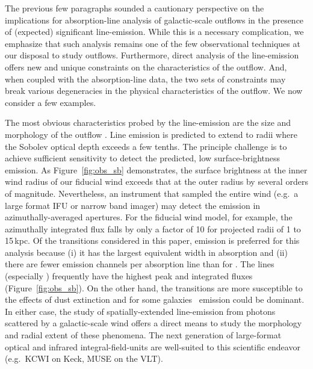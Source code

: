 \documentclass[12pt,preprint]{aastex}
\begin{document}


The previous few paragraphs sounded a cautionary 
perspective on the implications for absorption-line analysis of
galactic-scale outflows in the presence of (expected) significant
line-emission.   While this is a necessary complication, 
we emphasize that such analysis remains one of the few observational
techniques at our disposal to study outflows.  Furthermore,
direct analysis of
the line-emission offers new and unique
constraints on the characteristics of the outflow.  And, when coupled
with the absorption-line data, the two sets of constraints may break
various degeneracies in the physical characteristics of the outflow.
We now consider a few examples.

The most obvious characteristics probed by the line-emission are
the size and morphology of the outflow \citep{rubin+10c}.  
Line emission is predicted to extend to radii where the Sobolev
optical depth exceeds a few tenths.  The principle
challenge is to achieve sufficient sensitivity to detect the
predicted,
low surface-brightness emission. As Figure~\ref{fig:obs_sb}
demonstrates, the surface brightness at the inner wind radius of our
fiducial wind exceeds that at the outer radius by several orders of magnitude.
Nevertheless, an instrument that sampled the entire wind (e.g.\ a
large format IFU or narrow band imager) may detect the emission in
azimuthally-averaged apertures. 
For the fiducial wind model, for example, the azimuthally integrated
flux falls by only a factor of 10 for projected radii of 1 to 15\,kpc.
Of the transitions considered in this paper,  emission is
preferred for this analysis because 
(i) it has the largest equivalent width in absorption and
(ii) there are fewer emission channels per absorption line than for
.  The  lines (especially \mgiib) frequently have the
highest peak and integrated fluxes (Figure~\ref{fig:obs_sb}).  
On the other hand, the  transitions are more susceptible to
the effects of dust extinction and for some galaxies \feiis\ emission
could be dominant.  In either case, the study of spatially-extended
line-emission from photons scattered by a galactic-scale wind offers
a direct means to study the morphology and radial extent of these
phenomena.  The next generation of large-format optical and infrared
integral-field-units are well-suited to this scientific endeavor
(e.g.\ KCWI on Keck, MUSE on the VLT).
\end{document}

